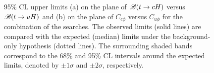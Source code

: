 \begin{figure}[t!]
\begin{center}
\caption{\small {95\% CL upper limits (a) on the plane of $\mathscr{B}(t\to cH)$ versus $\mathscr{B}(t\to uH)$ and (b) on the plane 
of $C_{c\phi}$ versus $C_{u\phi}$ for the combination of the searches. The observed limits (solid lines) are compared with the expected (median) limits under the background-only hypothesis (dotted lines). The surrounding shaded bands correspond to the 68\% and 95\% CL intervals around the expected limits, 
denoted by $\pm 1\sigma$ and $\pm 2\sigma$, respectively.}}
\label{fig:limits_combo_2D} 
\end{center}
\end{figure}





